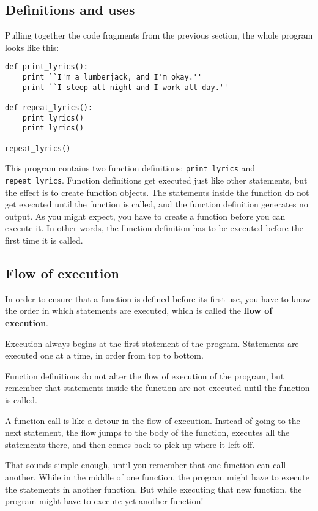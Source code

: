 \documentclass{article}
\begin{document}
\subsection{Definitions and uses}
Pulling together the code fragments from the previous section, the
whole program looks like this:
\begin{verbatim}
def print_lyrics():
    print ``I'm a lumberjack, and I'm okay.''
    print ``I sleep all night and I work all day.''

def repeat_lyrics():
    print_lyrics()
    print_lyrics()

repeat_lyrics()
\end{verbatim}

This program contains two function definitions:
\verb|print_lyrics| and \verb|repeat_lyrics|. Function definitions
get executed just like other statements, but the effect is to create
function objects. The statements inside the function do not get executed
until the function is called, and the function definition generates no output.
As you might expect, you have to create a function before you can execute it.
In other words, the function definition has to be executed before the
first time it is called.

\subsection{Flow of execution}
In order to ensure that a function is defined before its first use,
you have to know the order in which statements are executed, which is
called the \textbf{flow of execution}.

Execution always begins at the first statement of the program.
Statements are executed one at a time, in order from top to bottom.

Function definitions do not alter the flow of execution of the
program, but remember that statements inside the function are not
executed until the function is called.

A function call is like a detour in the flow of execution. Instead of
going to the next statement, the flow jumps to the body of the
function, executes all the statements there, and then comes back to
pick up where it left off.

That sounds simple enough, until you remember that one function can
call another. While in the middle of one function, the program might
have to execute the statements in another function. But while
executing that new function, the program might have to execute yet
another function!
\end{document}
